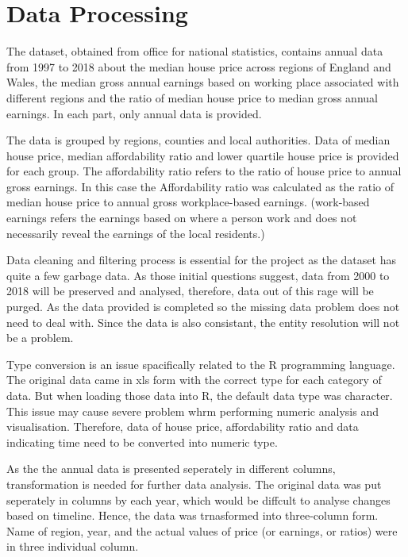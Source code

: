 \documentclass{article}
\begin{document}



\section{Data Processing}

The dataset, obtained from office for national statistics, contains annual data from 1997 to 2018 about 
the median house price across regions of England and Wales, the median gross annual 
earnings based on working place associated with different regions and the ratio of 
median house price to median gross annual earnings.\cite{henretty_2019} \cite{henretty_data_2019}
In each part, only annual data is provided. 

The data is grouped by regions, counties and local authorities. Data of median house price, median 
affordability ratio and lower quartile house price is provided for each group. The affordability ratio 
refers to the ratio of house price to annual gross earnings. In this case the Affordability ratio was 
calculated as the ratio of median house price to annual gross workplace-based earnings. 
(work-based earnings refers the earnings based on where a person work and does not necessarily reveal 
the earnings of the local residents.)

Data cleaning and filtering process is essential for the project as the dataset has quite a few garbage data. 
As those initial questions suggest, data from 2000 to 2018 will be preserved and analysed, therefore, data 
out of this rage will be purged. As the data provided is completed so the missing data problem does not need 
to deal with. Since the data is also consistant, the entity resolution will not be a problem. 

Type conversion is an issue spacifically related to the R programming language. The original data came in 
xls form with the correct type for each category of data. But when loading those data into R, the default 
data type was character. This issue may cause severe problem whrm performing numeric analysis and visualisation. 
Therefore, data of house price, affordability ratio and data indicating time need to be converted into numeric type. 

As the the annual data is presented seperately in different columns, transformation is needed for further 
data analysis. The original data was put seperately in columns by each year, which would be diffcult to 
analyse changes based on timeline. Hence, the data was trnasformed into three-column form. Name of region, 
year, and the actual values of price (or earnings, or ratios) were in three individual column.
\end{document}

